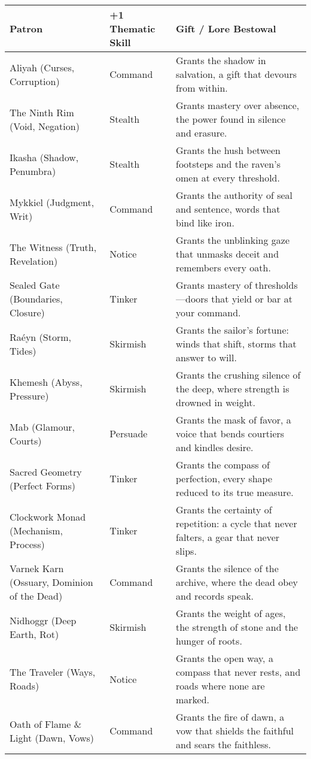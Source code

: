 \begin{table}[H]
  \centering
  \renewcommand{\arraystretch}{1.15}
  \begin{tabular}{@{}p{3.8cm}p{3.8cm}p{7.5cm}@{}}
  \toprule
  \textbf{Patron} & \textbf{+1 Thematic Skill} & \textbf{Gift / Lore Bestowal} \\
  \midrule
  Aliyah (Curses, Corruption) & Command & Grants the shadow in salvation, a gift that devours from within. \\
  The Ninth Rim (Void, Negation) & Stealth & Grants mastery over absence, the power found in silence and erasure. \\
  Ikasha (Shadow, Penumbra) & Stealth & Grants the hush between footsteps and the raven’s omen at every threshold. \\
  Mykkiel (Judgment, Writ) & Command & Grants the authority of seal and sentence, words that bind like iron. \\
  The Witness (Truth, Revelation) & Notice & Grants the unblinking gaze that unmasks deceit and remembers every oath. \\
  Sealed Gate (Boundaries, Closure) & Tinker & Grants mastery of thresholds—doors that yield or bar at your command. \\
  Raéyn (Storm, Tides) & Skirmish & Grants the sailor’s fortune: winds that shift, storms that answer to will. \\
  Khemesh (Abyss, Pressure) & Skirmish & Grants the crushing silence of the deep, where strength is drowned in weight. \\
  Mab (Glamour, Courts) & Persuade & Grants the mask of favor, a voice that bends courtiers and kindles desire. \\
  Sacred Geometry (Perfect Forms) & Tinker & Grants the compass of perfection, every shape reduced to its true measure. \\
  Clockwork Monad (Mechanism, Process) & Tinker & Grants the certainty of repetition: a cycle that never falters, a gear that never slips. \\
  Varnek Karn (Ossuary, Dominion of the Dead) & Command & Grants the silence of the archive, where the dead obey and records speak. \\
  Nidhoggr (Deep Earth, Rot) & Skirmish & Grants the weight of ages, the strength of stone and the hunger of roots. \\
  The Traveler (Ways, Roads) & Notice & Grants the open way, a compass that never rests, and roads where none are marked. \\
  Oath of Flame \& Light (Dawn, Vows) & Command & Grants the fire of dawn, a vow that shields the faithful and sears the faithless. \\

\end{tabular}
\end{table}
